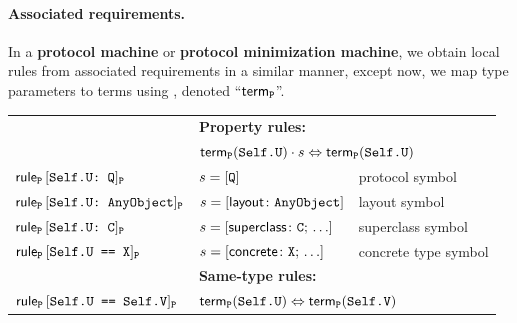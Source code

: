 \documentclass[../generics]{subfiles}
\begin{document}
\paragraph{Associated requirements.}
In a \textbf{protocol machine} or \textbf{protocol minimization machine}, we obtain local rules from associated requirements in a similar manner, except now, we map type parameters to terms using , denoted ``$\mathsf{term}_{\texttt{P}}$''.
\begin{center}
\begin{tabular}{lll}
\toprule
&\textbf{Property rules:}&\\
&\multicolumn{2}{l}{$\mathsf{term}_{\texttt{P}}(\texttt{Self.U}) \cdot s \Leftrightarrow \mathsf{term}_{\texttt{P}}(\texttt{Self.U})$}\\
\midrule
$\mathsf{rule}_{\texttt{P}}\, [\texttt{Self.U:~Q}]_{\texttt{P}}$ & $s = [\texttt{Q}]$&protocol symbol\\
$\mathsf{rule}_{\texttt{P}}\, [\texttt{Self.U:~AnyObject}]_{\texttt{P}}$ & $s = [\mathsf{layout}\colon\texttt{AnyObject}]$&layout symbol\\
$\mathsf{rule}_{\texttt{P}}\, [\texttt{Self.U:~C}]_{\texttt{P}}$ & $s = [\mathsf{superclass}\colon \texttt{C};\,\ldots]$&superclass symbol\\
$\mathsf{rule}_{\texttt{P}}\, [\texttt{Self.U == X}]_{\texttt{P}}$ & $s = [\mathsf{concrete}\colon \texttt{X};\,\ldots]$&concrete type symbol\\
\midrule
&\textbf{Same-type rules:}&\\
$\mathsf{rule}_{\texttt{P}}\, [\texttt{Self.U == Self.V}]_{\texttt{P}}$ & \multicolumn{2}{l}{$\mathsf{term}_{\texttt{P}}(\texttt{Self.U})\Leftrightarrow\mathsf{term}_{\texttt{P}}(\texttt{Self.V})$}\\
\bottomrule
\end{tabular}
\end{center}

\smallskip
\end{document}
